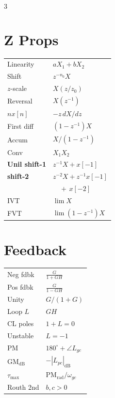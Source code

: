 \documentclass[11pt]{extarticle}
\newcommand{\rtable}[1]{\noindent\hfill#1}
\begin{document}
\begin{paracol}{3}
{\begin{minipage}[t]{\columnwidth}
\section*{\hfill Z Props}
\hfill\begin{tabular}{@{}l l@{}}
\toprule
Linearity & $aX_1{+}bX_2$ \\
Shift & $z^{-n_0}X$ \\
$z$-scale & $X(z/z_0)$ \\
Reversal & $X(z^{-1})$ \\
$nx[n]$ & $-z\,dX/dz$ \\
First diff & $(1{-}z^{-1})X$ \\
Accum & $X/(1{-}z^{-1})$ \\
Conv & $X_1X_2$ \\
\textbf{Unil shift-1} & $z^{-1}X{+}x[-1]$ \\
\textbf{shift-2} & $z^{-2}X{+}z^{-1}x[-1]$ \\
 & $\quad{+}\,x[-2]$ \\
IVT & $\lim X$ \\
FVT & $\lim(1{-}z^{-1})X$ \\
\bottomrule
\end{tabular}
\end{minipage}
}

\vspace{6pt}
\rtable{%
\begin{minipage}[t]{\columnwidth}
\section*{\hfill Feedback}
\hfill\begin{tabular}{@{}l l@{}}
\toprule
Neg fdbk & $\tfrac{G}{1{+}GH}$ \\
Pos fdbk & $\tfrac{G}{1{-}GH}$ \\
Unity & $G/(1{+}G)$ \\
Loop $L$ & $GH$ \\
CL poles & $1{+}L{=}0$ \\
Unstable & $L{=}{-}1$ \\
PM & $180^\circ{+}\angle L_{gc}$ \\
GM$_\mathrm{dB}$ & ${-}|L_{pc}|_\mathrm{dB}$ \\
$\tau_{\max}$ & $\mathrm{PM}_\mathrm{rad}/\omega_{gc}$ \\
Routh 2nd & $b,c{>}0$ \\
\bottomrule
\end{tabular}
\end{minipage}
}


\end{paracol}
\end{document}
